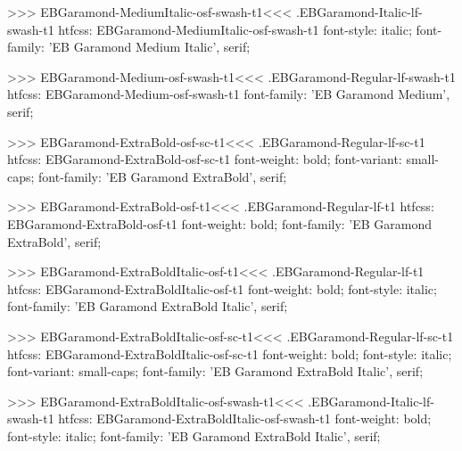 {{{{{{{>>>
\<EBGaramond-MediumItalic-osf-swash-t1\><<<
.EBGaramond-Italic-lf-swash-t1
htfcss:  EBGaramond-MediumItalic-osf-swash-t1  font-style: italic; font-family: 'EB Garamond Medium Italic', serif;

>>>
\<EBGaramond-Medium-osf-swash-t1\><<<
.EBGaramond-Regular-lf-swash-t1
htfcss:  EBGaramond-Medium-osf-swash-t1  font-family: 'EB Garamond Medium', serif;

>>>
\<EBGaramond-ExtraBold-osf-sc-t1\><<<
.EBGaramond-Regular-lf-sc-t1
htfcss:  EBGaramond-ExtraBold-osf-sc-t1  font-weight: bold; font-variant: small-caps; font-family: 'EB Garamond ExtraBold', serif;

>>>
\<EBGaramond-ExtraBold-osf-t1\><<<
.EBGaramond-Regular-lf-t1
htfcss:  EBGaramond-ExtraBold-osf-t1  font-weight: bold; font-family: 'EB Garamond ExtraBold', serif;

>>>
\<EBGaramond-ExtraBoldItalic-osf-t1\><<<
.EBGaramond-Regular-lf-t1
htfcss:  EBGaramond-ExtraBoldItalic-osf-t1  font-weight: bold; font-style: italic; font-family: 'EB Garamond ExtraBold Italic', serif;

>>>
\<EBGaramond-ExtraBoldItalic-osf-sc-t1\><<<
.EBGaramond-Regular-lf-sc-t1
htfcss:  EBGaramond-ExtraBoldItalic-osf-sc-t1  font-weight: bold; font-style: italic; font-variant: small-caps; font-family: 'EB Garamond ExtraBold Italic', serif;

>>>
\<EBGaramond-ExtraBoldItalic-osf-swash-t1\><<<
.EBGaramond-Italic-lf-swash-t1
htfcss:  EBGaramond-ExtraBoldItalic-osf-swash-t1  font-weight: bold; font-style: italic; font-family: 'EB Garamond ExtraBold Italic', serif;

}}}}}}}
